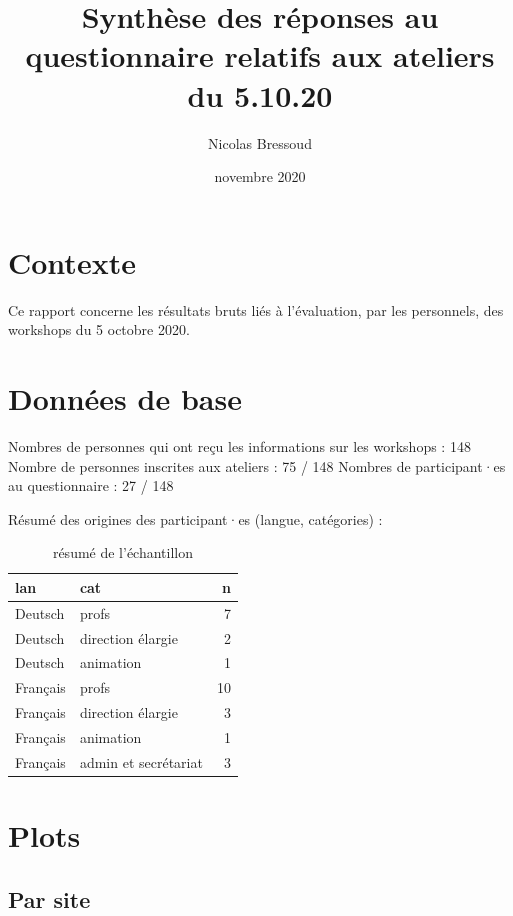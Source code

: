 \documentclass[
  french,
]{article}
\title{Synthèse des réponses au questionnaire relatifs aux ateliers du 5.10.20}
\author{Nicolas Bressoud}
\date{novembre 2020}
\begin{document}
\maketitle

\renewcommand*\contentsname{Table des matières}
{
\setcounter{tocdepth}{2}
\tableofcontents
}
\hypertarget{contexte}{%
\section{Contexte}\label{contexte}}

Ce rapport concerne les résultats bruts liés à l'évaluation, par les personnels, des workshops du 5 octobre 2020.

\hypertarget{donnuxe9es-de-base}{%
\section{Données de base}\label{donnuxe9es-de-base}}

Nombres de personnes qui ont reçu les informations sur les workshops : 148
Nombre de personnes inscrites aux ateliers : 75 / 148
Nombres de participant·es au questionnaire : 27 / 148

Résumé des origines des participant·es (langue, catégories) :

\begin{table}

\caption{\label{tab:table}résumé de l'échantillon}
\centering
\begin{tabular}[t]{l|l|r}
\hline
lan & cat & n\\
\hline
Deutsch & profs & 7\\
\hline
Deutsch & direction élargie & 2\\
\hline
Deutsch & animation & 1\\
\hline
Français & profs & 10\\
\hline
Français & direction élargie & 3\\
\hline
Français & animation & 1\\
\hline
Français & admin et secrétariat & 3\\
\hline
\end{tabular}
\end{table}

\hypertarget{plots}{%
\section{Plots}\label{plots}}

\hypertarget{par-site}{%
\subsection{Par site}\label{par-site}}
\end{document}
